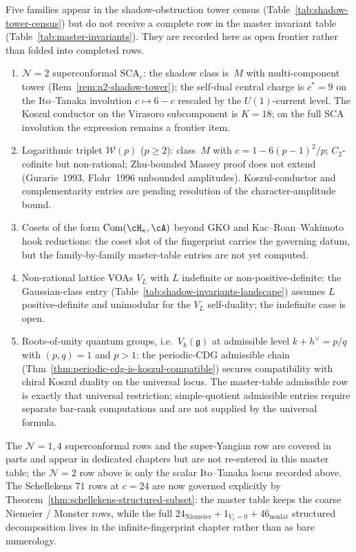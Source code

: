\begin{remark}
\label{rem:census-silent-non-coverage}
Five families appear in the shadow-obstruction tower census
(Table~\ref{tab:shadow-tower-census}) but do not receive a complete
row in the master invariant table
(Table~\ref{tab:master-invariants}). They are recorded here as
open frontier rather than folded into completed rows.
\begin{enumerate}[leftmargin=*]
 \item $\mathcal{N}{=}2$ superconformal $\mathrm{SCA}_c$: the
 shadow class is~$M$ with multi-component tower
 (Rem~\ref{rem:n2-shadow-tower}); the self-dual central charge
 is $c^{*}=9$ on the Ito--Tanaka involution
 $c\mapsto 6-c$ rescaled by the $U(1)$-current level. The Koszul
 conductor on the Virasoro subcomponent is $K=18$; on the full
 $\mathrm{SCA}$ involution the expression remains a frontier item.
 \item Logarithmic triplet $\mathcal{W}(p)$ ($p\ge 2$): class~$M$
 with $c = 1 - 6(p-1)^{2}/p$; $C_{2}$-cofinite but non-rational;
 Zhu-bounded Massey proof does not extend (Gurarie~1993,
 Flohr~1996 unbounded amplitudes). Koszul-conductor and
 complementarity entries are pending resolution of the
 character-amplitude bound.
 \item Cosets of the form $\operatorname{Com}(\cH_{\kappa},\cA)$
 beyond GKO and Kac--Roan--Wakimoto hook reductions: the coset
 slot of the fingerprint carries the governing datum, but the
 family-by-family master-table entries are not yet computed.
 \item Non-rational lattice VOAs $V_{L}$ with $L$ indefinite or
 non-positive-definite: the Gaussian-class entry
 (Table~\ref{tab:shadow-invariants-landscape}) assumes $L$
 positive-definite and unimodular for the $V_{L}$ self-duality;
 the indefinite case is open.
 \item Roots-of-unity quantum groups, i.e.\ $V_{k}(\mathfrak{g})$
 at admissible level $k+h^{\vee} = p/q$ with $(p,q)=1$ and $p>1$:
 the periodic-CDG admissible chain
 (Thm~\ref{thm:periodic-cdg-is-koszul-compatible}) secures
 compatibility with chiral Koszul duality on the universal locus. The
 master-table admissible row is exactly that universal restriction;
 simple-quotient admissible entries require separate bar-rank
 computations and are not supplied by the universal formula.
\end{enumerate}
The $\mathcal{N}{=}1,4$ superconformal rows and the super-Yangian
row are covered in parts and appear in dedicated chapters but are not
re-entered in this master table; the $\mathcal{N}{=}2$ row above is
only the scalar Ito--Tanaka locus recorded above. The
Schellekens $71$ rows at
$c=24$ are now governed explicitly by
Theorem~\ref{thm:schellekens-structured-subset}: the master table keeps
the coarse Niemeier / Monster rows, while the full
$24_{\mathrm{Niemeier}}+1_{V_1=0}+46_{\mathrm{nonlat}}$
structured decomposition lives in the
infinite-fingerprint chapter rather than as bare numerology.
\end{remark}

